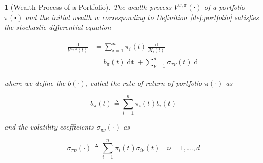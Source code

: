 \documentclass[british]{amsart}
\numberwithin{equation}{section}
\numberwithin{figure}{section}
\theoremstyle{plain}
\newtheorem{thm}{\protect\theoremname}[section]
\theoremstyle{definition}
\theoremstyle{plain}
\theoremstyle{plain}
\theoremstyle{plain}
\theoremstyle{remark}
\theoremstyle{plain}
\providecommand{\theoremname}{Theorem}
\renewcommand{\d}[1]{\mathop{\mathrm{d}{#1}}}
\newcommand{\defeq}{\mathop{\triangleq}}
\begin{document}
\begin{thm} [Wealth Process of a Portfolio]

	The wealth-process $V^{w,\pi}(\centerdot)$ of a portfolio $\pi(\centerdot)$ and the initial 
	wealth $w$ corresponding to Definition \ref{def:portfolio} satisfies the stochastic differential 
	equation

	\begin{gather}
		\label{eq:wealthprocess}
		\begin{split}
			\frac{\d{V^{w,\pi}(t)}}{V^{w,\pi}(t)} 
				&= \sum_{i=1}^{n} \pi_{i}(t) \frac{\d{X_{i}(t)}}{X_{i}(t)} \\
				&= b_{\pi}(t)\d{t} + \sum_{\nu=1}^{d} \sigma_{\pi\nu}(t) \d{W_{\nu}(t)}
		\end{split}
	\end{gather}

	where we define the $b(\cdot)$, called the rate-of-return of portfolio $\pi(\cdot)$ as

	\begin{equation}
		\label{eq:bpi}
		b_{\pi}(t) \defeq \sum_{i=1}^{n} \pi_{i}(t) b_{i}(t)
	\end{equation}

	and the volatility coefficients $\sigma_{\pi\nu}(\cdot)$ as

	\begin{equation}
		\label{eq:sigmapi}
		\sigma_{\pi\nu}(\cdot) \defeq \sum_{i=1}^{n} \pi_{i}(t) \sigma_{i\nu}(t)
		\quad \nu=1,\dots,d
	\end{equation}

\end{thm}
\end{document}

